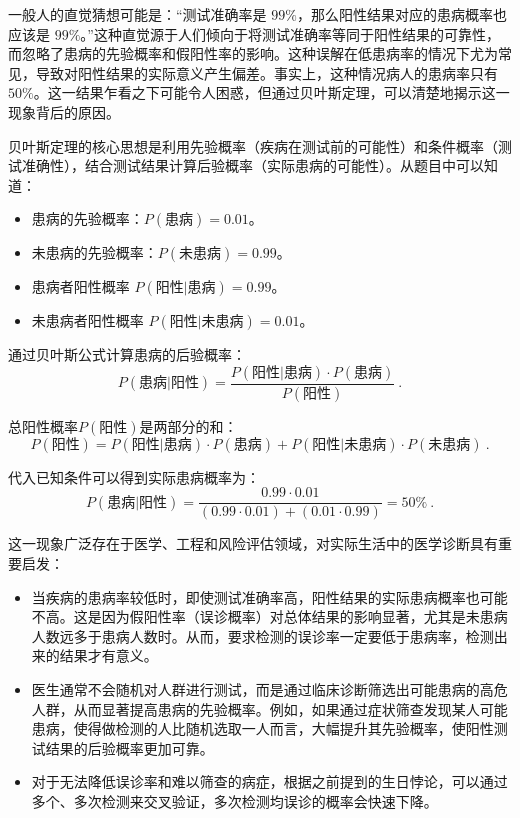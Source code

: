 一般人的直觉猜想可能是：“测试准确率是 $99\%$，那么阳性结果对应的患病概率也应该是 $99\%$。”这种直觉源于人们倾向于将测试准确率等同于阳性结果的可靠性，而忽略了患病的先验概率和假阳性率的影响。这种误解在低患病率的情况下尤为常见，导致对阳性结果的实际意义产生偏差。事实上，这种情况病人的患病率只有$50\%$。这一结果乍看之下可能令人困惑，但通过贝叶斯定理，可以清楚地揭示这一现象背后的原因。

贝叶斯定理的核心思想是利用先验概率（疾病在测试前的可能性）和条件概率（测试准确性），结合测试结果计算后验概率（实际患病的可能性）。从题目中可以知道：

\begin{itemize}
\item 患病的先验概率：$P(\text{患病}) = 0.01$。
\item 未患病的先验概率：$P(\text{未患病}) = 0.99$。
\item 患病者阳性概率 $P(\text{阳性}|\text{患病}) = 0.99$。
\item 未患病者阳性概率 $P(\text{阳性}|\text{未患病}) = 0.01$。
\end{itemize}

通过贝叶斯公式计算患病的后验概率：
\begin{equation}
P(\text{患病}|\text{阳性}) = \frac{P(\text{阳性}|\text{患病}) \cdot P(\text{患病})}{P(\text{阳性})}~.
\end{equation}

总阳性概率$P(\text{阳性})$是两部分的和：
\begin{equation}
P(\text{阳性}) = P(\text{阳性}|\text{患病}) \cdot P(\text{患病}) + P(\text{阳性}|\text{未患病}) \cdot P(\text{未患病})~.
\end{equation}

代入已知条件可以得到实际患病概率为：
\begin{equation}
P(\text{患病}|\text{阳性}) = \frac{0.99 \cdot 0.01}{(0.99 \cdot 0.01) + (0.01 \cdot 0.99)}= 50\%~.
\end{equation}

这一现象广泛存在于医学、工程和风险评估领域，对实际生活中的医学诊断具有重要启发：
\begin{itemize}
\item 当疾病的患病率较低时，即使测试准确率高，阳性结果的实际患病概率也可能不高。这是因为假阳性率（误诊概率）对总体结果的影响显著，尤其是未患病人数远多于患病人数时。从而，要求检测的误诊率一定要低于患病率，检测出来的结果才有意义。
\item 医生通常不会随机对人群进行测试，而是通过临床诊断筛选出可能患病的高危人群，从而显著提高患病的先验概率。例如，如果通过症状筛查发现某人可能患病，使得做检测的人比随机选取一人而言，大幅提升其先验概率，使阳性测试结果的后验概率更加可靠。
\item 对于无法降低误诊率和难以筛查的病症，根据之前提到的生日悖论，可以通过多个、多次检测来交叉验证，多次检测均误诊的概率会快速下降。
\end{itemize}

